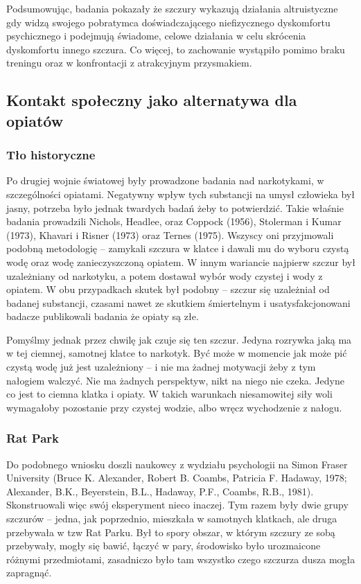\documentclass[12pt]{article}
\begin{document}
Podsumowując, badania pokazały że szczury wykazują działania altruistyczne gdy widzą swojego pobratymca doświadczającego niefizycznego dyskomfortu psychicznego i podejmują świadome, celowe działania w celu skrócenia dyskomfortu innego szczura. Co więcej, to zachowanie wystąpiło pomimo braku treningu oraz w konfrontacji z atrakcyjnym przysmakiem.

\subsection{Kontakt społeczny jako alternatywa dla opiatów}

\subsubsection{Tło historyczne}

Po drugiej wojnie światowej były prowadzone badania nad narkotykami, w szczególności opiatami. Negatywny wpływ tych substancji na umysł człowieka był jasny, potrzeba było jednak twardych badań żeby to potwierdzić. Takie właśnie badania prowadzili Nichols, Headlee, oraz Coppock (1956), Stolerman i Kumar (1973), Khavari i Risner (1973) oraz Ternes (1975). Wszyscy oni przyjmowali podobną metodologię -- zamykali szczura w klatce i dawali mu do wyboru czystą wodę oraz wodę zanieczyszczoną opiatem. W innym wariancie najpierw szczur był uzależniany od narkotyku, a potem dostawał wybór wody czystej i wody z opiatem. W obu przypadkach skutek był podobny -- szczur się uzależniał od badanej substancji, czasami nawet ze skutkiem śmiertelnym i usatysfakcjonowani badacze publikowali badania że opiaty są złe.

Pomyślmy jednak przez chwilę jak czuje się ten szczur. Jedyna rozrywka jaką ma w tej ciemnej, samotnej klatce to narkotyk. Być może w momencie jak może pić czystą wodę już jest uzależniony -- i nie ma żadnej motywacji żeby z tym nałogiem walczyć. Nie ma żadnych perspektyw, nikt na niego nie czeka. Jedyne co jest to ciemna klatka i opiaty. W takich warunkach niesamowitej siły woli wymagałoby pozostanie przy czystej wodzie, albo wręcz wychodzenie z nałogu.

\subsubsection{Rat Park}

Do podobnego wniosku doszli naukowcy z wydziału psychologii na Simon Fraser University (Bruce K. Alexander, Robert B. Coambs, Patricia F. Hadaway, 1978; Alexander, B.K., Beyerstein, B.L., Hadaway, P.F., Coambs, R.B., 1981). Skonstruowali więc swój eksperyment nieco inaczej. Tym razem były dwie grupy szczurów -- jedna, jak poprzednio, mieszkała w samotnych klatkach, ale druga przebywała w tzw Rat Parku. Był to spory obszar, w którym szczury ze sobą przebywały, mogły się bawić, łączyć w pary, środowisko było urozmaicone różnymi przedmiotami, zasadniczo było tam wszystko czego szczurza dusza mogła zapragnąć.
\end{document}
